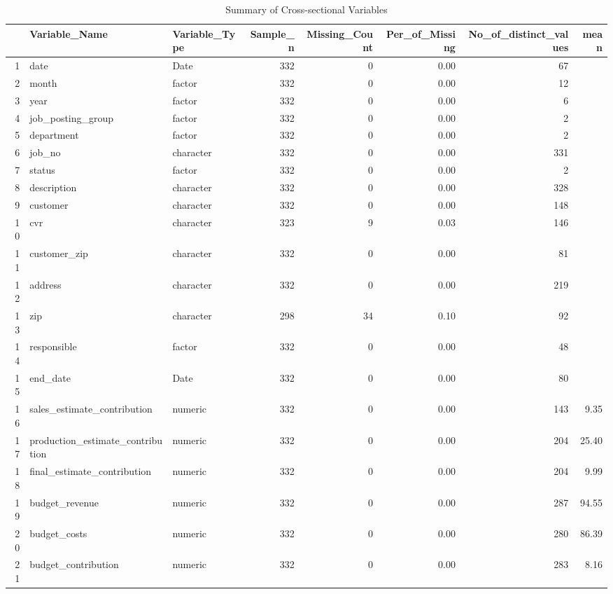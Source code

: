 \begin{sidewaystable}[ht]
\centering
\caption{Summary of Cross-sectional Variables} 
\begin{tabular}{rllrrrrr}
  \hline
 & Variable\_Name & Variable\_Type & Sample\_n & Missing\_Count & Per\_of\_Missing & No\_of\_distinct\_values & mean \\ 
  \hline
1 & date & Date & 332 &   0 & 0.00 &  67 &  \\ 
  2 & month & factor & 332 &   0 & 0.00 &  12 &  \\ 
  3 & year & factor & 332 &   0 & 0.00 &   6 &  \\ 
  4 & job\_posting\_group & factor & 332 &   0 & 0.00 &   2 &  \\ 
  5 & department & factor & 332 &   0 & 0.00 &   2 &  \\ 
  6 & job\_no & character & 332 &   0 & 0.00 & 331 &  \\ 
  7 & status & factor & 332 &   0 & 0.00 &   2 &  \\ 
  8 & description & character & 332 &   0 & 0.00 & 328 &  \\ 
  9 & customer & character & 332 &   0 & 0.00 & 148 &  \\ 
  10 & cvr & character & 323 &   9 & 0.03 & 146 &  \\ 
  11 & customer\_zip & character & 332 &   0 & 0.00 &  81 &  \\ 
  12 & address & character & 332 &   0 & 0.00 & 219 &  \\ 
  13 & zip & character & 298 &  34 & 0.10 &  92 &  \\ 
  14 & responsible & factor & 332 &   0 & 0.00 &  48 &  \\ 
  15 & end\_date & Date & 332 &   0 & 0.00 &  80 &  \\ 
  16 & sales\_estimate\_contribution & numeric & 332 &   0 & 0.00 & 143 & 9.35 \\ 
  17 & production\_estimate\_contribution & numeric & 332 &   0 & 0.00 & 204 & 25.40 \\ 
  18 & final\_estimate\_contribution & numeric & 332 &   0 & 0.00 & 204 & 9.99 \\ 
  19 & budget\_revenue & numeric & 332 &   0 & 0.00 & 287 & 94.55 \\ 
  20 & budget\_costs & numeric & 332 &   0 & 0.00 & 280 & 86.39 \\ 
  21 & budget\_contribution & numeric & 332 &   0 & 0.00 & 283 & 8.16 \\ 

\end{tabular}
\end{sidewaystable}
